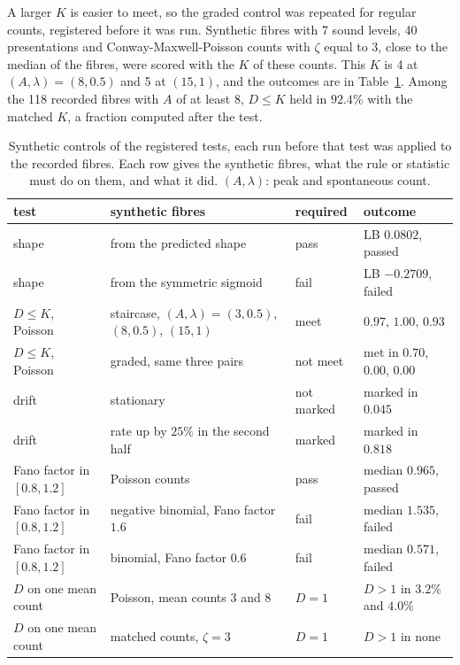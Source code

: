 A larger $K$ is easier to meet, so the graded control was repeated for regular counts, registered before it was run. Synthetic fibres
with 7 sound levels, 40 presentations and Conway-Maxwell-Poisson counts with $\zeta$ equal to 3, close to the median of the fibres,
were scored with the $K$ of these counts. This $K$ is 4 at $(A,\lambda)=(8,0.5)$ and 5 at $(15,1)$, and the outcomes are in Table~\ref{tab:controls}. Among the 118 recorded fibres
with $A$ of at least 8, $D\le K$ held in $92.4\%$ with the matched $K$, a fraction computed after the test.


\begin{table}[tp]
\caption{Synthetic controls of the registered tests, each run before that test was applied to the recorded fibres. Each row gives the synthetic
fibres, what the rule or statistic must do on them, and what it did. $(A,\lambda)$: peak and spontaneous count.}\label{tab:controls}
\centering
\small
\begin{tabular}{>{\raggedright\arraybackslash}p{3.0cm}>{\raggedright\arraybackslash}p{5.0cm}>{\raggedright\arraybackslash}p{2.2cm}>{\raggedright\arraybackslash}p{3.6cm}}
\hline
test & synthetic fibres & required & outcome\\
\hline
shape & 200 from the predicted shape & pass & LB $0.0802$, passed\\
shape & 200 from the symmetric sigmoid & fail & LB $-0.2709$, failed\\
$D\le K$, Poisson & staircase, $(A,\lambda)=(3,0.5)$, $(8,0.5)$, $(15,1)$ & meet & $0.97$, $1.00$, $0.93$\\
$D\le K$, Poisson & graded, same three pairs & not meet & met in $0.70$, $0.00$, $0.00$\\
drift & stationary & not marked & marked in $0.045$\\
drift & rate up by $25\%$ in the second half & marked & marked in $0.818$\\
Fano factor in $[0.8,1.2]$ & Poisson counts & pass & median $0.965$, passed\\
Fano factor in $[0.8,1.2]$ & negative binomial, Fano factor $1.6$ & fail & median $1.535$, failed\\
Fano factor in $[0.8,1.2]$ & binomial, Fano factor $0.6$ & fail & median $0.571$, failed\\
$D$ on one mean count & Poisson, mean counts 3 and 8 & $D=1$ & $D>1$ in $3.2\%$ and $4.0\%$\\
$D$ on one mean count & matched counts, $\zeta=3$ & $D=1$ & $D>1$ in none\\

\end{tabular}
\end{table}
